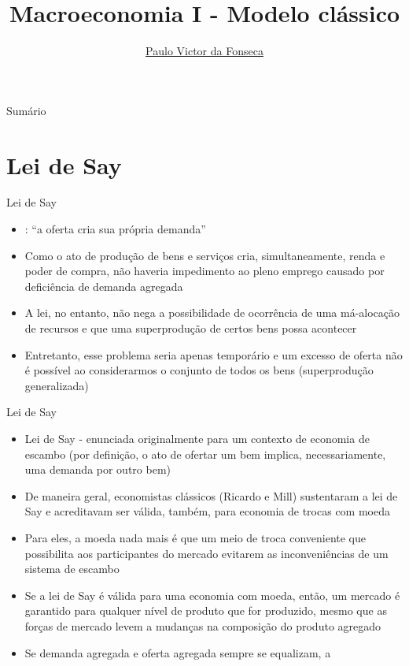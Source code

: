 \documentclass[10pt]{beamer}
\title[]{Macroeconomia I - Modelo clássico}
\author[]{\href{https://pvfonseca.github.io}{Paulo Victor da Fonseca}}
\date{}
\begin{document}
\begin{frame}[plain]
    \titlepage{
        \begin{center}
            \begin{minipage}{\textwidth}
                \centering
            \end{minipage}
        \end{center}}
\end{frame}

\begin{frame}{Sumário}
    \tableofcontents
\end{frame}

\section{Lei de Say}
\begin{frame}
    {Lei de Say}
    \begin{itemize}
        \item {}: ``a oferta cria sua própria demanda'' \bigskip
        \item Como o ato de produção de bens e serviços cria, simultaneamente, renda e poder de compra, não haveria impedimento ao pleno emprego causado por deficiência de demanda agregada\bigskip
        \item A lei, no entanto, não nega a possibilidade de ocorrência de uma má-alocação de recursos e que uma superprodução de certos bens possa acontecer\bigskip
        \item Entretanto, esse problema seria apenas temporário e um excesso de oferta não é possível ao considerarmos o conjunto de todos os bens (superprodução generalizada) 
    \end{itemize}
\end{frame}

\begin{frame}
    {Lei de Say}
    \begin{itemize}
        \item Lei de Say - enunciada originalmente para um contexto de economia de escambo (por definição, o ato de ofertar um bem implica, necessariamente, uma demanda por outro bem)\bigskip
        \item De maneira geral, economistas clássicos (Ricardo e Mill) sustentaram a lei de Say e acreditavam ser válida, também, para economia de trocas com moeda\bigskip
        \item Para eles, a moeda nada mais é que um meio de troca conveniente que possibilita aos participantes do mercado evitarem as inconveniências de um sistema de escambo\bigskip
        \item Se a lei de Say é válida para uma economia com moeda, então, um mercado é garantido para qualquer nível de produto que for produzido, mesmo que as forças de mercado levem a mudanças na composição do produto agregado\bigskip
        \item Se demanda agregada e oferta agregada sempre se equalizam, a 
    \end{itemize}
\end{frame}
\end{document}
